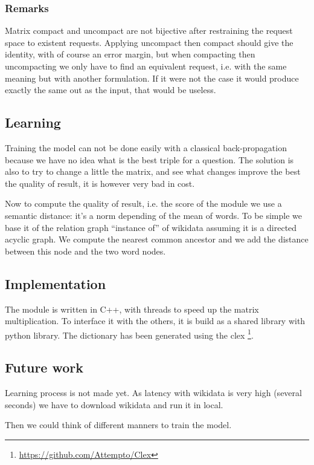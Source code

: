 \subsubsection{Remarks}

Matrix compact and uncompact are not bijective after restraining the request space to existent requests. Applying uncompact then compact should give the identity, with of course an error margin, but when compacting then uncompacting we only have to find an equivalent request, i.e. with the same meaning but with another formulation. If it were not the case it would produce exactly the same out as the input, that would be useless.

\subsection{Learning}

Training the model can not be done easily with a classical back-propagation because we have no idea what is the best triple for a question. The solution is also to try to change a little the matrix, and see what changes improve the best the quality of result, it is however very bad in cost. 

Now to compute the quality of result, i.e. the score  of the module we use a semantic distance: it's a norm depending of the mean of words. To be simple we base it of the relation graph ``instance of'' of wikidata assuming it is a directed acyclic graph. We compute the nearest common ancestor and we add the distance between this node and the two word  nodes.

\subsection{Implementation}

The module is written in C++, with threads to speed up the matrix multiplication. To interface it with the others, it is build as a shared library with python library. The dictionary has been generated using the clex \footnote{\url{https://github.com/Attempto/Clex}}. 

\subsection{Future work}

Learning process is not made yet. As latency with wikidata is very high (several seconds) we have to download wikidata and run it in local.

Then we could think of different manners to train the model.



